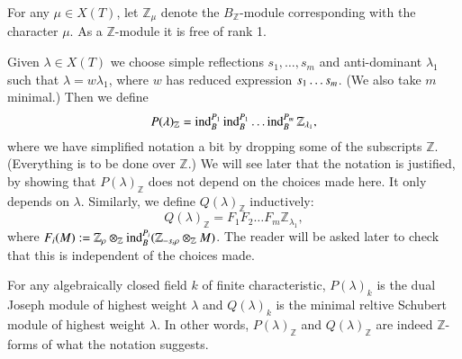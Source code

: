 \begin{definition}\label{chap7-defi7.2.1}
For any $\mu\in X(T)$, let $\mathbb{Z}_{\mu}$ denote the
$B_{\mathbb{Z}}$-module corresponding with the character $\mu$. As a
$\mathbb{Z}$-module it is free of rank 1. 
\end{definition}

Given $\lambda\in X(T)$ we choose simple reflections
$s_{1},\ldots,s_{m}$ and anti-dominant $\lambda_{1}$ such that
$\lambda=w\lambda_{1}$, where $w$ has reduced expression $s_{1}\ldots\break
s_{m}$. (We also take $m$ minimal.) Then we define
$$
P(\lambda)_{\mathbb{Z}}=\operatorname{ind}^{P_{1}}_{B}\operatorname{ind}^{P_{1}}_{B}\ldots
\operatorname{ind}^{P_{m}}_{B}\mathbb{Z}_{\lambda_{1}}, 
$$
where we have simplified notation a bit by dropping some of the
subscripts $\mathbb{Z}$. (Everything is to be done over $\mathbb{Z}$.)
We will see later that the notation is justified, by showing that
$P(\lambda)_{\mathbb{Z}}$ does not depend on the choices made here. It
only depends on $\lambda$. Similarly, we define
$Q(\lambda)_{\mathbb{Z}}$ inductively:
$$
Q(\lambda)_{\mathbb{Z}}=F_{1}F_{2}\ldots
F_{m}\mathbb{Z}_{\lambda_{1}},
$$
where
$F_{i}(M):=\mathbb{Z}_{\rho}\otimes_{\mathbb{Z}}\operatorname{ind}^{P_{i}}_{B}(\mathbb{Z}_{-s_{i}\rho}\otimes_{\mathbb{Z}}M)$. The
reader will be asked later to check that this is independent of the
choices made.

\begin{proposition}\label{chap7-prop7.2.2}
For any algebraically closed field $k$ of finite characteristic,
$P(\lambda)_{k}$ is the dual Joseph module of highest weight $\lambda$
and $Q(\lambda)_{k}$ is the minimal reltive Schubert module of highest
weight $\lambda$. In other words, $P(\lambda)_{\mathbb{Z}}$ and
$Q(\lambda)_{\mathbb{Z}}$ are indeed $\mathbb{Z}$-forms of what the
notation suggests.
\end{proposition}

